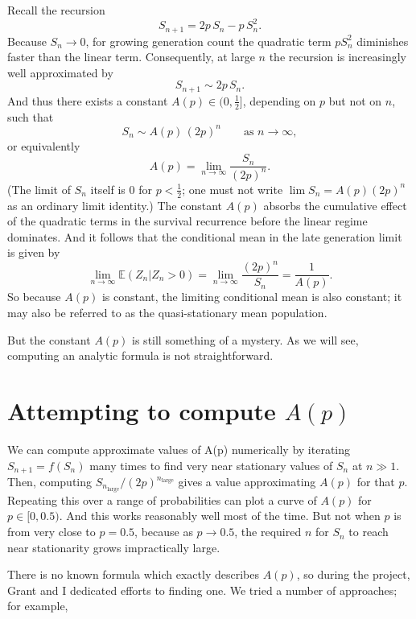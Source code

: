 \documentclass[11pt]{article}
\begin{document}
Recall the recursion
\[
S_{n+1} = 2p\, S_n - p\, S_n^2.
\]
Because $S_n \to 0$, for growing generation count the quadratic term $p S_n^2$ diminishes faster than the
linear term. Consequently, at large $n$ the recursion is increasingly well approximated by
\[
S_{n+1} \sim 2p\, S_n.
\]
And thus there exists a constant $A(p)\in(0,\tfrac12]$, depending on $p$ but not on $n$, such that
\begin{equation}
\label{eq:Sn-asymp}
S_n \sim A(p)\,(2p)^n
\qquad\text{as }n\to\infty,
\end{equation}
or equivalently
\begin{equation}
\label{eq:Ap-def-main}
 A(p) = \lim_{n \to \infty} \frac{S_n}{(2p)^n}.
\end{equation}
(The limit of $S_n$ itself is $0$ for $p<\tfrac12$; one must not write $\lim S_n = A(p)(2p)^n$ as an ordinary limit identity.)
The constant $A(p)$ absorbs the cumulative effect of the quadratic terms in the survival recurrence before the linear regime dominates.
And it follows that the conditional mean in the late generation limit is given by
\[
 \lim_{n\to\infty} \mathbb{E}(Z_n | Z_n > 0) = \lim_{n \to \infty} \frac{(2p)^n}{S_n} = \frac{1}{A(p)}.
\]
So because $A(p)$ is constant, the limiting conditional mean is also constant; it may also be referred to as the quasi-stationary mean population.

But the constant $A(p)$ is still something of a mystery. As we will see, computing an analytic formula is not straightforward. 

\section{Attempting to compute $A(p)$}

We can compute approximate values of A(p) numerically by iterating $S_{n+1} = f(S_n)$ many times to find very near stationary 
values of $S_n$ at $n \gg 1$. Then, computing $S_{n_{\text{large}}} / (2p)^{n_{\text{large}}}$ gives a value approximating $A(p)$ for that $p$. 
Repeating this over a range of probabilities can plot a curve of $A(p)$ for $p\in[0, 0.5)$. And this works reasonably well most of the time. But not when $p$ is from very close to $p=0.5$, because as $p\to0.5$, the required $n$
for $S_n$ to reach near stationarity grows impractically large.


There is no known formula which exactly describes $A(p)$, so during the project, Grant and I dedicated efforts
to finding one. We tried a number of approaches; for example, 
\end{document}
